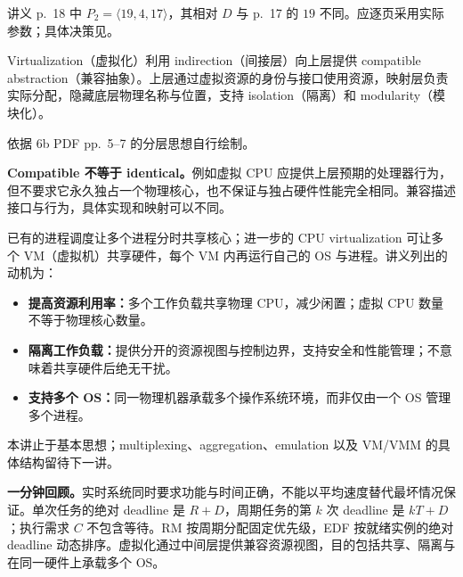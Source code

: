 讲义 p.~18 中 $P_2=\langle19,4,17\rangle$，其相对 $D$ 与 p.~17 的 $19$ 不同。应逐页采用实际参数；具体决策见。


Virtualization（虚拟化）利用 indirection（间接层）向上层提供 compatible abstraction（兼容抽象）。上层通过虚拟资源的身份与接口使用资源，映射层负责实际分配，隐藏底层物理名称与位置，支持 isolation（隔离）和 modularity（模块化）。

\begin{center}
\par\small 依据 6b PDF pp.~5--7 的分层思想自行绘制。
\end{center}

\textbf{Compatible 不等于 identical。}例如虚拟 CPU 应提供上层预期的处理器行为，但不要求它永久独占一个物理核心，也不保证与独占硬件性能完全相同。兼容描述接口与行为，具体实现和映射可以不同。

已有的进程调度让多个进程分时共享核心；进一步的 CPU virtualization 可让多个 VM（虚拟机）共享硬件，每个 VM 内再运行自己的 OS 与进程。讲义列出的动机为：
\begin{itemize}
  \item \textbf{提高资源利用率：}多个工作负载共享物理 CPU，减少闲置；虚拟 CPU 数量不等于物理核心数量。
  \item \textbf{隔离工作负载：}提供分开的资源视图与控制边界，支持安全和性能管理；不意味着共享硬件后绝无干扰。
  \item \textbf{支持多个 OS：}同一物理机器承载多个操作系统环境，而非仅由一个 OS 管理多个进程。
\end{itemize}
本讲止于基本思想；multiplexing、aggregation、emulation 以及 VM/VMM 的具体结构留待下一讲。

\textbf{一分钟回顾。}实时系统同时要求功能与时间正确，不能以平均速度替代最坏情况保证。单次任务的绝对 deadline 是 $R+D$，周期任务的第 $k$ 次 deadline 是 $kT+D$；执行需求 $C$ 不包含等待。RM 按周期分配固定优先级，EDF 按就绪实例的绝对 deadline 动态排序。虚拟化通过中间层提供兼容资源视图，目的包括共享、隔离与在同一硬件上承载多个 OS。
